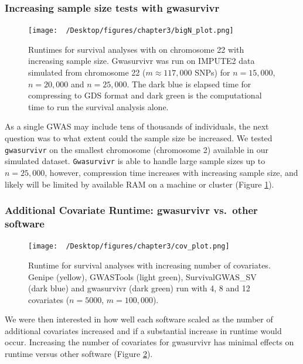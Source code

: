\documentclass[]{DissertateOSU}
\begin{document}
\subsubsection{Increasing sample size tests with
gwasurvivr}\label{increasing-sample-size-tests-with-gwasurvivr}

\begin{figure}
    \centering
    \texttt{[image: ~/Desktop/figures/chapter3/bigN\_plot.png]}
    \caption[Runtimes for survival analyses with on chromosome 22 with increasing sample size.]{Runtimes for survival analyses with on chromosome 22 with increasing sample size. Gwasurvivr was run on IMPUTE2 data simulated from chromosome 22 ($m \approx 117,000$ SNPs) for $n=15,000$, $n=20,000$ and $n=25,000$. The dark blue is elapsed time for compressing to GDS format and dark green is the computational time to run the survival analysis alone.}
    \label{fig:gwsfig2}  
\end{figure}

As a single GWAS may include tens of thousands of individuals, the next
question was to what extent could the sample size be increased. We
tested \texttt{gwasurvivr} on the smallest chromosome (chromosome 2)
available in our simulated dataset. \texttt{Gwasurvivr} is able to
handle large sample sizes up to \(n=25,000\), however, compression time
increases with increasing sample size, and likely will be limited by
available RAM on a machine or cluster (Figure \ref{fig:gwsfig2}).

\subsubsection{Additional Covariate Runtime: gwasurvivr vs.~other
software}\label{additional-covariate-runtime-gwasurvivr-vs.other-software}

\begin{figure}
    \centering
    \texttt{[image: ~/Desktop/figures/chapter3/cov\_plot.png]}
    \caption[Runtime for survival analyses with increasing number of covariates.]{Runtime for survival analyses with increasing number of covariates. Genipe (yellow), GWASTools (light green), SurvivalGWAS\_SV (dark blue) and gwasurvivr (dark green) run with 4, 8 and 12 covariates ($n = 5000$, $m=100,000$).}  
    \label{fig:gwsfig3}  
\end{figure}

We were then interested in how well each software scaled as the number
of additional covariates increased and if a substantial increase in
runtime would occur. Increasing the number of covariates for gwasurvivr
has minimal effects on runtime versus other software (Figure
\ref{fig:gwsfig3}).
\end{document}
